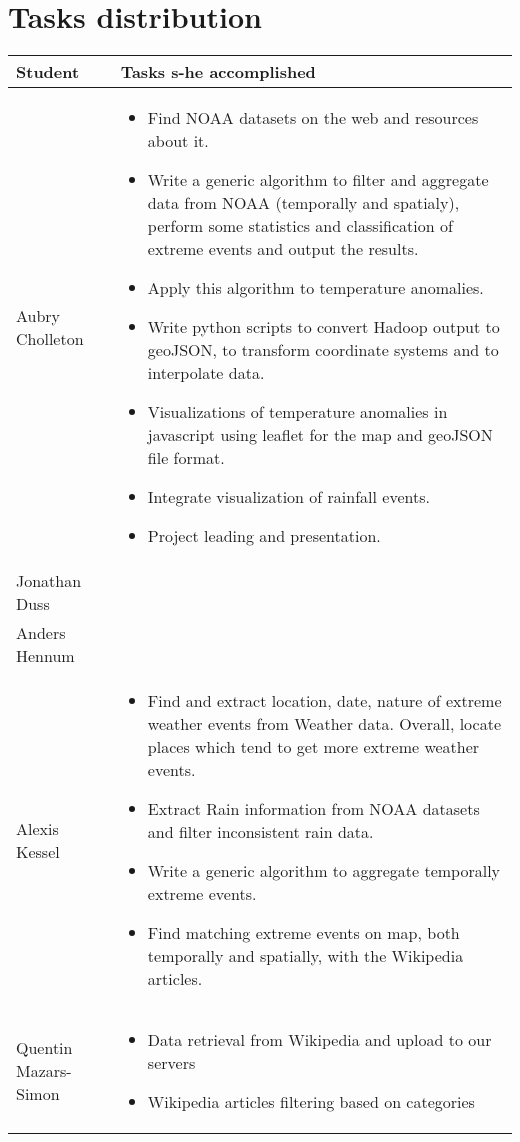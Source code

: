 \section{Tasks distribution}
\begin{tabular}{|l|p{10.5cm}|}
\hline
\textbf{Student} & \textbf{Tasks s-he accomplished} \\
\hline
Aubry Cholleton & \begin{itemize}
	\item Find NOAA datasets on the web and resources about it.
	\item Write a generic algorithm to filter and aggregate data from NOAA (temporally and spatialy), perform some statistics and classification of extreme events and output the results.
	\item Apply this algorithm to temperature anomalies.
	\item Write python scripts to convert Hadoop output to geoJSON, to transform coordinate systems and to interpolate data.
	\item Visualizations of temperature anomalies in javascript using leaflet for the map and geoJSON file format.
	\item Integrate visualization of rainfall events.
	\item Project leading and presentation.
\end{itemize}\\
\hline
Jonathan Duss & \\
\hline
Anders Hennum & \\
\hline
Alexis Kessel & \begin{itemize}
	\item Find and extract location, date, nature of extreme weather events from Weather data. Overall, locate places which tend to get more extreme weather events.
	\item Extract Rain information from NOAA datasets and filter inconsistent rain data.
	\item Write a generic algorithm to aggregate temporally extreme events.
	\item Find matching extreme events on map, both temporally and spatially, with the Wikipedia articles.
\end{itemize}\\
\hline
Quentin Mazars-Simon & \begin{itemize}
	\item Data retrieval from Wikipedia and upload to our servers
	\item Wikipedia articles filtering based on categories

\end{itemize}
\end{tabular}
